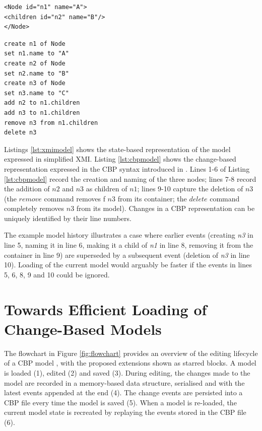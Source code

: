 \documentclass{llncs}
\begin{document}
    \vspace{-10pt}
\begin{minipage}[t]{0.49\linewidth}
\begin{lstlisting}[style=xmi,caption={The tree model expressed in state-based format, in simplified XMI.},label=lst:xmimodel]
<Node id="n1" name="A">
<children id="n2" name="B"/>
</Node>
\end{lstlisting}
\end{minipage}
\hfill
\begin{minipage}[t]{0.49\linewidth}
\begin{lstlisting}[style=eol,caption={The tree model expressed change-based format.},label=lst:cbpmodel]
create n1 of Node
set n1.name to "A"  
create n2 of Node
set n2.name to "B"  
create n3 of Node
set n3.name to "C"  
add n2 to n1.children   
add n3 to n1.children
remove n3 from n1.children   
delete n3
\end{lstlisting}
\end{minipage}

    Listings \ref{lst:xmimodel} shows the state-based representation of the model expressed in simplified XMI.  Listing \ref{lst:cbpmodel} shows the change-based representation expressed in the CBP syntax introduced in \cite{yohannis2017turning}. Lines 1-6 of Listing \ref{lst:cbpmodel} record the creation and naming of the three nodes; lines 7-8 record the addition of $n2$ and $n3$ as children of $n1$; lines 9-10 capture the deletion of $n3$ (the $remove$ command removes f $n3$ from its container; the $delete$ command completely removes $n3$ from its model). Changes in a CBP representation can be uniquely identified by their line numbers.
    
    The example model history illustrates a case where earlier events (creating \emph{n3} in line 5, naming it in line 6, making it a child of \emph{n1} in line 8, removing it from the container in line 9) are superseded by a subsequent event (deletion of \emph{n3} in line 10).  Loading of the current model would arguably be faster if the events in lines 5, 6, 8, 9 and 10 could be ignored.
    
    \vspace{-10pt}
    \section{Towards Efficient Loading of Change-Based Models}
    \label{sec:loading_time_optimisation}
    
    \vspace{-10pt}
    The flowchart in Figure \ref{fig:flowchart} provides an overview of the editing lifecycle of a CBP model \cite{yohannis2017turning}, with the proposed extensions shown as starred blocks. A model is loaded (1), edited (2) and saved (3).  During editing, the changes made to the model are recorded in a memory-based data structure, serialised and with the latest events appended at the end (4). The change events are persisted into a CBP file every time the model is saved (5). When a model is re-loaded, the current model state is recreated by replaying the events stored in the CBP file (6).
    
\end{document}
